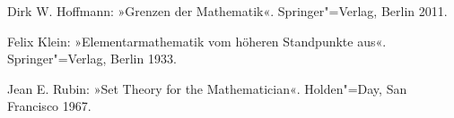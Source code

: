 
\begin{thebibliography}{00}

Dirk W. Hoffmann: »Grenzen der Mathematik«.
Springer"=Verlag, Berlin 2011.

Felix Klein: »Elementarmathematik vom höheren Standpunkte aus«.\\
Springer"=Verlag, Berlin 1933.

Jean E. Rubin: »Set Theory for the Mathematician«.
Holden"=Day, San Francisco 1967.

\end{thebibliography}
